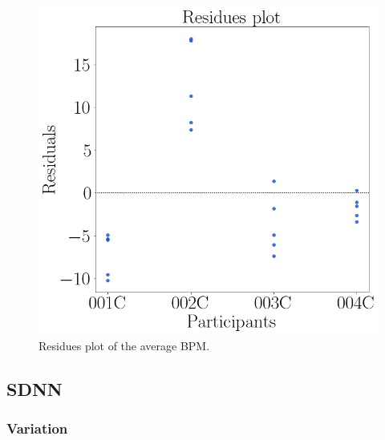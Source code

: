 \begin{figure}[!htb]
\begin{minipage}{0.45\linewidth}
                \includegraphics[width = \linewidth]{Resultados/ECG/Figuras/png/residplot_bpm.png}
                \caption{Residues plot of the average BPM.}
                \label{fig:residual_bom_average}
            \end{minipage}
        \end{figure}

\FloatBarrier

\subsection{SDNN}

    \subsubsection{Variation}

